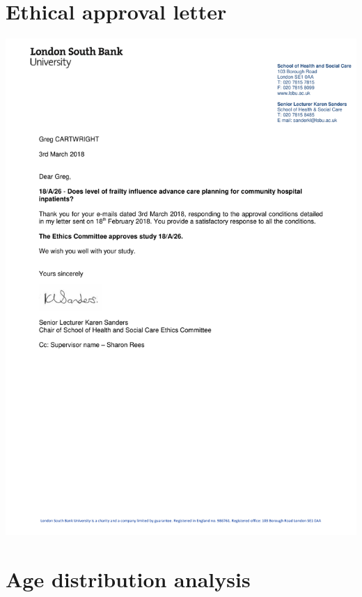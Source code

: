 \documentclass
[
	12pt,
	a4paper,
	oneside,
]{report}
\begin{document}
	\parencite[page 8]{bgs:14}

\chapter{Ethical approval letter}

\label{apx:ethics}
\includegraphics[width=\textwidth]{media/final-ethics-approval}

\chapter{Age distribution analysis}

\label{apx:dist-analysis}
\end{document}
